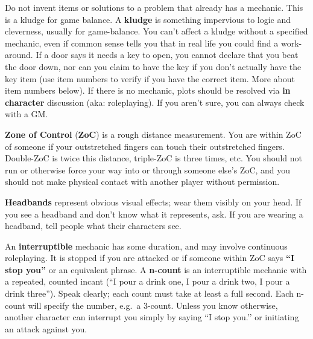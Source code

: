 \documentclass[sheet]{GL2020}
\begin{document}
Do not invent items or solutions to a problem that already has a mechanic. This is a kludge for game balance. A \textbf{kludge} is something impervious to logic and cleverness, usually for game-balance.  You can't affect a kludge without a specified mechanic, even if common sense tells you that in real life you could find a work-around. If a door says it needs a key to open, you cannot declare that you beat the door down, nor can you claim to have the key if you don't actually have the key item (use item numbers to verify if you have the correct item. More about item numbers below).  If there is no mechanic, plots should be resolved via \textbf{in character} discussion (aka: roleplaying). If you aren’t sure, you can always check with a GM. 

{\bf Zone of Control} ({\bf ZoC}) is a rough distance measurement. You are within ZoC of someone if your outstretched fingers can touch their outstretched fingers.  Double-ZoC is twice this distance, triple-ZoC is three times, etc. You should not run or otherwise force your way into or through someone else's ZoC, and you should not make physical contact with another player without permission.

{\bf Headbands} represent obvious visual effects; wear them visibly on your head. If you see a headband and don't know what it represents, ask. If you are wearing a headband, tell people what their characters see.

An {\bf interruptible} mechanic has some duration, and may involve continuous roleplaying.  It is stopped if you are attacked or if someone within ZoC says {\bf ``I stop you''} or an equivalent phrase. A {\bf n-count} is an interruptible mechanic with a repeated, counted incant (``I pour a drink one, I pour a drink two, I pour a drink three'').  Speak clearly; each count must take at least a full second. Each n-count will specify the number, e.g.\ a 3-count. Unless you know otherwise, another character can interrupt you simply by saying ``I stop you.’’ or initiating an attack against you.

\end{document}
